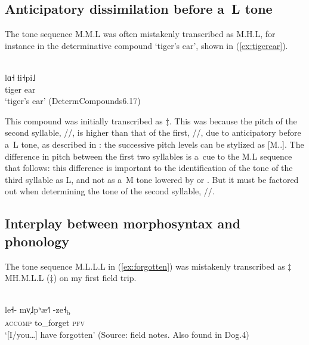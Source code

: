 \subsection{Anticipatory dissimilation before a~L tone}
\label{sec:anticipatorydissimilationbeforealtone}

The tone sequence M.M.L was often mistakenly transcribed as M.H.L, for instance in the determinative
compound ‘tiger’s ear’, shown in (\ref{ex:tigerear}).

\begin{exe}
	\ex
	\label{ex:tigerear}
	\\ 
	\gll lɑ˧	ɬi˧pi˩\\
	tiger		ear\\
	\glt ‘tiger's ear’ (DetermCompounds6.17)
\end{exe}

This compound was initially transcribed as $\ddagger${\kern2pt}. This was
because the pitch of the second syllable, //, is higher than that of the first, //, due to anticipatory
 before a~L tone, as described in : the successive pitch levels can be stylized as [M..]. The
difference in pitch between the first two syllables is a~cue to the M.L sequence that follows: this difference is important to the identification of the tone
of the third syllable as L, and not as a~M tone lowered by \textit{} or \textit{}. But it
must be factored out when determining the tone of the second syllable, //.


\subsection{Interplay between morphosyntax and phonology}
\label{sec:theinterplaybetweenmorphosyntacticinformationandphonologicalinformationinspeechcomprehension}

The tone sequence M.L.L.L in (\ref{ex:forgotten}) was mistakenly transcribed as $\ddagger${\kern2pt}MH.M.L.L ($\ddagger${\kern2pt}) on my first field trip. 

\begin{exe}
	\ex
	\label{ex:forgotten}
	\\
	\gll le˧-	mv̩˩pʰæ˧˥	-ze˧\textsubscript{b}\\
	\textsc{accomp}		to\_forget		\textsc{pfv}\\
	\glt ‘[I/you{\dots}] have forgotten’ (Source: field notes. Also found in Dog.4)
\end{exe}

